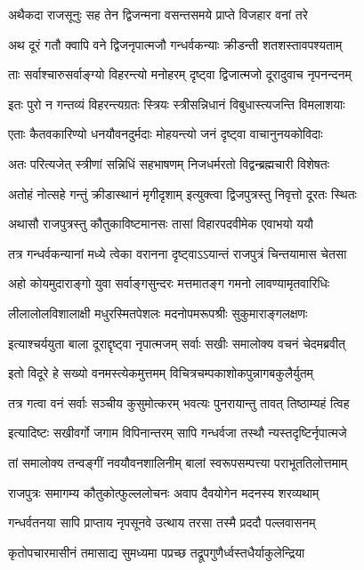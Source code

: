 \begin{center}
\twolineshloka
{अथैकदा राजसूनुः सह तेन द्विजन्मना}
{वसन्तसमये प्राप्ते विजहार वनां तरे} %

\twolineshloka
{अथ दूरं गतौ क्वापि वने द्विजनृपात्मजौ}
{गन्धर्वकन्याः क्रीडन्ती शतशस्तावपश्यताम्} %

\twolineshloka
{ताः सर्वाश्चारुसर्वाङ्ग्यो विहरन्त्यो मनोहरम्}
{दृष्ट्वा द्विजात्मजो दूरादुवाच नृपनन्दनम्} %

\twolineshloka
{इतः पुरो न गन्तव्यं विहरन्त्यग्रतः स्त्रियः}
{स्त्रीसन्निधानं विबुधास्त्यजन्ति विमलाशयाः} %

\twolineshloka
{एताः कैतवकारिण्यो धनयौवनदुर्मदाः}
{मोहयन्त्यो जनं दृष्ट्वा वाचानुनयकोविदाः} %

\twolineshloka
{अतः परित्यजेत् स्त्रीणां सन्निधिं सहभाषणम्}
{निजधर्मरतो विद्वन्ब्रह्मचारी विशेषतः} %

\twolineshloka
{अतोहं नोत्सहे गन्तुं क्रीडास्थानं मृगीदृशाम्}
{इत्युक्त्वा द्विजपुत्रस्तु निवृत्तो दूरतः स्थितः} %

\twolineshloka
{अथासौ राजपुत्रस्तु कौतुकाविष्टमानसः}
{तासां विहारपदवीमेक एवाभयो ययौ} %

\twolineshloka
{तत्र गन्धर्वकन्यानां मध्ये त्वेका वरानना}
{दृष्ट्वाऽऽयान्तं राजपुत्रं चिन्तयामास चेतसा} %

\twolineshloka
{अहो कोयमुदाराङ्गो युवा सर्वाङ्गसुन्दरः}
{मत्तमातङ्ग गमनो लावण्यामृतवारिधिः} %

\twolineshloka
{लीलालोलविशालाक्षी मधुरस्मितपेशलः}
{मदनोपमरूपश्रीः सुकुमाराङ्गलक्षणः} %

\twolineshloka
{इत्याश्चर्ययुता बाला दूराद्दृष्ट्वा नृपात्मजम्}
{सर्वाः सखीः समालोक्य वचनं चेदमब्रवीत्} %

\twolineshloka
{इतो विदूरे हे सख्यो वनमस्त्येकमुत्तमम्}
{विचित्रचम्पकाशोकपुन्नागबकुलैर्युतम्} %

\twolineshloka
{तत्र गत्वा वनं सर्वाः सञ्चीय कुसुमोत्करम्}
{भवत्यः पुनरायान्तु तावत् तिष्ठाम्यहं त्विह} %

\twolineshloka
{इत्यादिष्टः सखीवर्गो जगाम विपिनान्तरम्}
{सापि गन्धर्वजा तस्थौ न्यस्तदृष्टिर्नृपात्मजे} %

\twolineshloka
{तां समालोक्य तन्वङ्गीं नवयौवनशालिनीम्}
{बालां स्वरूपसम्पत्त्या पराभूततिलोत्तमाम्} %

\twolineshloka
{राजपुत्रः समागम्य कौतुकोत्फुल्ललोचनः}
{अवाप दैवयोगेन मदनस्य शरव्यथाम्} %

\twolineshloka
{गन्धर्वतनया सापि प्राप्ताय नृपसूनवे}
{उत्थाय तरसा तस्मै प्रददौ पल्लवासनम्} %

\twolineshloka
{कृतोपचारमासीनं तमासाद्य सुमध्यमा}
{पप्रच्छ तद्रूपगुणैर्ध्वस्तधैर्याकुलेन्द्रिया} %


\end{center}

